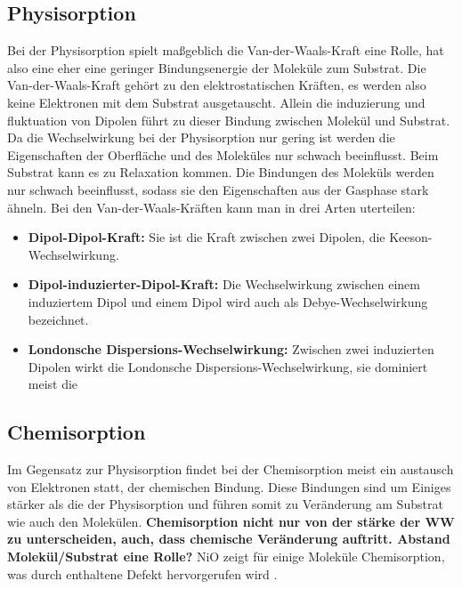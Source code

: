         \subsection{Physisorption}
            Bei der Physisorption spielt maßgeblich die Van-der-Waals-Kraft eine Rolle, hat also eine eher eine geringer Bindungsenergie der Moleküle zum Substrat.
            Die Van-der-Waals-Kraft gehört zu den elektrostatischen Kräften, es werden also keine Elektronen mit dem Substrat ausgetauscht.
            Allein die induzierung und fluktuation von Dipolen führt zu dieser Bindung zwischen Molekül und Substrat.
            Da die Wechselwirkung bei der Physisorption nur gering ist werden die Eigenschaften der Oberfläche und des Moleküles nur schwach beeinflusst.
            Beim Substrat kann es zu Relaxation kommen.
            Die Bindungen des Moleküls werden nur schwach beeinflusst, sodass sie den Eigenschaften aus der Gasphase stark ähneln.
            Bei den Van-der-Waals-Kräften kann man in drei Arten uterteilen:
            \begin{itemize}
                \item \textbf{Dipol-Dipol-Kraft:} Sie ist die Kraft zwischen zwei Dipolen, die Keeson-Wechselwirkung.
                \item \textbf{Dipol-induzierter-Dipol-Kraft:} Die Wechselwirkung zwischen einem induziertem Dipol und einem Dipol wird auch als Debye-Wechselwirkung bezeichnet.
                \item \textbf{Londonsche Dispersions-Wechselwirkung:} Zwischen zwei induzierten Dipolen wirkt die Londonsche Dispersions-Wechselwirkung, sie dominiert meist die 
            \end{itemize}
        
        
        \subsection{Chemisorption}
            Im Gegensatz zur Physisorption findet bei der Chemisorption meist ein austausch von Elektronen statt, der chemischen Bindung.
            Diese Bindungen sind um Einiges stärker als die der Physisorption und führen somit zu Veränderung am Substrat wie auch den Molekülen.
            \textbf{Chemisorption nicht nur von der stärke der WW zu unterscheiden, auch, dass chemische Veränderung auftritt.
            Abstand Molekül/Substrat eine Rolle?}
            NiO zeigt für einige Moleküle Chemisorption, was durch enthaltene Defekt hervorgerufen wird \cite{kunz_chemisorption_1985}.
            
